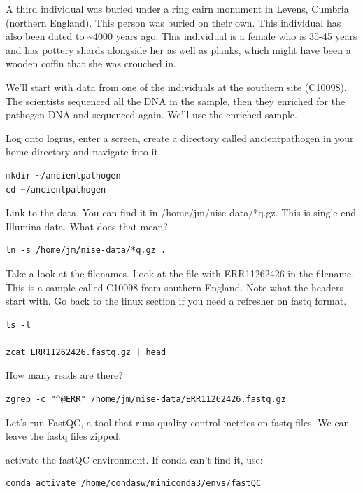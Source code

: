 \documentclass[
]{book}
\begin{document}
A third individual was buried under a ring cairn monument in Levens, Cumbria (northern England). This person was buried on their own. This individual has also been dated to \textasciitilde4000 years ago. This individual is a female who is 35-45 years and has pottery shards alongside her as well as planks, which might have been a wooden coffin that she was crouched in.

We'll start with data from one of the individuals at the southern site (C10098). The scientists sequenced all the DNA in the sample, then they enriched for the pathogen DNA and sequenced again. We'll use the enriched sample.

Log onto logrus, enter a screen, create a directory called ancientpathogen in your home directory and navigate into it.

\begin{verbatim}
mkdir ~/ancientpathogen
cd ~/ancientpathogen
\end{verbatim}

Link to the data. You can find it in /home/jm/nise-data/*q.gz. This is single end Illumina data. What does that mean?

\begin{verbatim}
ln -s /home/jm/nise-data/*q.gz .
\end{verbatim}

Take a look at the filenames. Look at the file with ERR11262426 in the filename. This is a sample called C10098 from southern England. Note what the headers start with. Go back to the linux section if you need a refresher on fastq format.

\begin{verbatim}
ls -l

zcat ERR11262426.fastq.gz | head
\end{verbatim}

How many reads are there?

\begin{verbatim}
zgrep -c "^@ERR" /home/jm/nise-data/ERR11262426.fastq.gz
\end{verbatim}

Let's run FastQC, a tool that runs quality control metrics on fastq files. We can leave the fastq files zipped.

activate the fastQC environment. If conda can't find it, use:

\begin{verbatim}
conda activate /home/condasw/miniconda3/envs/fastQC
\end{verbatim}
\end{document}
